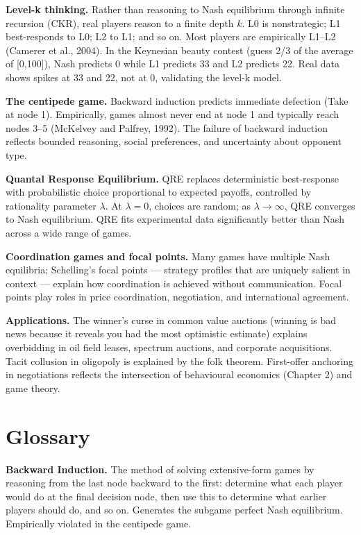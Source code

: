 \documentclass[12pt, letterpaper]{article}
\begin{document}
\textbf{Level-k thinking.} Rather than reasoning to Nash equilibrium through infinite recursion (CKR), real players reason to a finite depth $k$. L0 is nonstrategic; L1 best-responds to L0; L2 to L1; and so on. Most players are empirically L1--L2 (Camerer et al., 2004). In the Keynesian beauty contest (guess 2/3 of the average of [0,100]), Nash predicts 0 while L1 predicts 33 and L2 predicts 22. Real data shows spikes at 33 and 22, not at 0, validating the level-k model.

\textbf{The centipede game.} Backward induction predicts immediate defection (Take at node 1). Empirically, games almost never end at node 1 and typically reach nodes 3--5 (McKelvey and Palfrey, 1992). The failure of backward induction reflects bounded reasoning, social preferences, and uncertainty about opponent type.

\textbf{Quantal Response Equilibrium.} QRE replaces deterministic best-response with probabilistic choice proportional to expected payoffs, controlled by rationality parameter $\lambda$. At $\lambda = 0$, choices are random; as $\lambda \to \infty$, QRE converges to Nash equilibrium. QRE fits experimental data significantly better than Nash across a wide range of games.

\textbf{Coordination games and focal points.} Many games have multiple Nash equilibria; Schelling's focal points --- strategy profiles that are uniquely salient in context --- explain how coordination is achieved without communication. Focal points play roles in price coordination, negotiation, and international agreement.

\textbf{Applications.} The winner's curse in common value auctions (winning is bad news because it reveals you had the most optimistic estimate) explains overbidding in oil field leases, spectrum auctions, and corporate acquisitions. Tacit collusion in oligopoly is explained by the folk theorem. First-offer anchoring in negotiations reflects the intersection of behavioural economics (Chapter 2) and game theory.

\medskip


\section*{Glossary}


\textbf{Backward Induction.} The method of solving extensive-form games by reasoning from the last node backward to the first: determine what each player would do at the final decision node, then use this to determine what earlier players should do, and so on. Generates the subgame perfect Nash equilibrium. Empirically violated in the centipede game.
\end{document}
